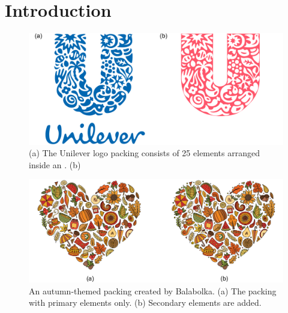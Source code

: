 
\chapter{Introduction}
\label{chapter_introduction}

\begin{figure}
\centering
\includegraphics[width=1.0\textwidth]{figures/intro/unilever_w_neg_space.pdf} 
\caption[Unilever logo packing and its negative space]
{\label{fig_logo_packing} 
(a) The Unilever logo packing consists of 25 elements arranged inside an . 
(b) 
}
\end{figure}

\begin{figure}
\centering
\includegraphics[width=1.0\textwidth]{figures/intro/primary_secondary.pdf}
\caption[Primary and secondary elements]{
  \label{fig_primary_secondary}
  \newtext
  {
  An autumn-themed packing created by Balabolka. }
  (a) The packing with primary elements only.
  (b) Secondary elements are added. 
}
\end{figure}

